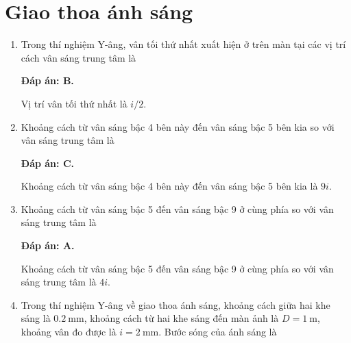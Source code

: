 \section{Giao thoa ánh sáng}
\begin{enumerate}[label=\bfseries Câu \arabic*:]
	\item {} 
	\cauhoi
	{Trong thí nghiệm Y-âng, vân tối thứ nhất xuất hiện ở trên màn tại các vị trí cách vân sáng trung tâm là
	}
	
	\loigiai
	{		\textbf{Đáp án: B.}
		
Vị trí vân tối thứ nhất là $ i/2 $.
		
	}
	
	\item {}
	\cauhoi
	{Khoảng cách từ vân sáng bậc 4 bên này đến vân sáng bậc 5 bên kia so với vân sáng trung tâm là
	}
	
	\loigiai
	{		\textbf{Đáp án: C.}
		
Khoảng cách từ vân sáng bậc 4 bên này đến vân sáng bậc 5 bên kia là $ 9i $.
	}
	
	\item {} 
	\cauhoi
	{Khoảng cách từ vân sáng bậc 5 đến vân sáng bậc 9 ở cùng phía so với vân sáng trung tâm là
	}
	
	\loigiai
	{		\textbf{Đáp án: A.}
		
Khoảng cách từ vân sáng bậc 5 đến vân sáng bậc 9 ở cùng phía so với vân sáng trung tâm là $ 4i $.
	}
	
	\item {} 
	\cauhoi
	{Trong thí nghiệm Y-âng về giao thoa ánh sáng, khoảng cách giữa hai khe sáng là $\SI{0.2}{\milli \meter}$, khoảng cách từ hai khe sáng đến màn ảnh là $D=\SI{1}{\meter}$, khoảng vân đo được là $i=\SI{2}{\milli \meter}$. Bước sóng của ánh sáng là
	}
	

\end{enumerate}
